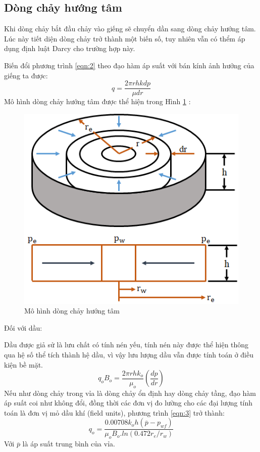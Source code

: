 \documentclass[12pt,a4paper]{report}
\begin{document}
\subsection{Dòng chảy hướng tâm}

Khi dòng chảy bắt đầu chảy vào giếng sẽ chuyển dần sang dòng chảy hướng tâm. Lúc này tiết diện dòng chảy trở thành một biến số, tuy nhiên vẫn có thểm áp dụng định luật Darcy cho trường hợp này\cite{dale1991production}.

Biến đổi phương trình \ref{eqn:2} theo đạo hàm áp suất với bán kính ảnh hưởng của giếng ta được:
	\begin{equation}
		q = \dfrac{2\pi rhk dp}{\mu dr}
	\end{equation}
Mô hình dòng chảy hướng tâm được thể hiện trong Hình \ref{fig:darcy_radial_flow} \cite{dale1991production}:
	\begin{figure}[h]
		\centering
		\includegraphics[scale=0.75]{Fig/darcy_radial_flow.png}
		\caption{Mô hình dòng chảy hướng tâm}
		\label{fig:darcy_radial_flow}
	\end{figure}
\newpage
Đối với dầu:

Dầu được giả sử là lưu chất có tính nén yếu, tính nén này được thể hiện thông qua hệ số thể tích thành hệ dầu, vì vậy lưu lượng dầu vẫn được tính toán ở điều kiện bề mặt.
	\begin{equation}\label{eqn:3}
		q_oB_o=\dfrac{2\pi rhk_o}{\mu_o}\left(\dfrac{dp}{dr}\right)
	\end{equation}
Nếu như dòng chảy trong vỉa là dòng chảy ổn định hay dòng chảy tầng, đạo hàm áp suất coi như không đổi, đồng thời các đơn vị đo lường cho các đại lượng tính toán là đơn vị mỏ dầu khí (field units), phương trình \ref{eqn:3} trở thành:
	\begin{equation}
		q_o = \dfrac{0.00708k_oh(\overline p-p_{wf})}{\mu_oB_o.ln(0.472r_e/r_w)}
	\end{equation}
Với $\overline p$ là áp suất trung bình của vỉa.
\end{document}
